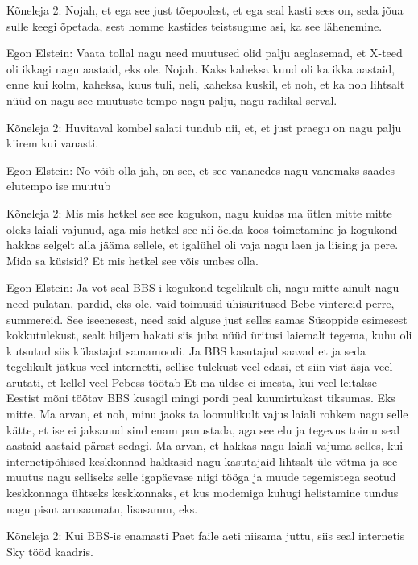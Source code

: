 Kõneleja 2:
Nojah, et ega see just tõepoolest, et ega seal kasti sees on, seda jõua sulle keegi õpetada, sest homme kastides teistsugune asi, ka see lähenemine.
                 
Egon Elstein:
Vaata tollal nagu need muutused olid palju aeglasemad, et X-teed oli ikkagi nagu aastaid, eks ole.
Nojah.
Kaks kaheksa kuud oli ka ikka aastaid, enne kui kolm, kaheksa, kuus tuli, neli, kaheksa kuskil, et noh, et ka noh lihtsalt nüüd on nagu see muutuste tempo nagu palju, nagu radikal serval.
                 
Kõneleja 2:
Huvitaval kombel salati tundub nii, et, et just praegu on nagu palju kiirem kui vanasti.
                 
Egon Elstein:
No võib-olla jah, on see, et see vananedes nagu vanemaks saades elutempo ise muutub
                 
Kõneleja 2:
Mis mis hetkel see see kogukon, nagu kuidas ma ütlen mitte mitte oleks laiali vajunud, aga mis hetkel see nii-öelda koos toimetamine ja kogukond hakkas selgelt alla jääma sellele, et igalühel oli vaja nagu laen ja liising ja pere. Mida sa küsisid? Et mis hetkel see võis umbes olla.
                 
Egon Elstein:
Ja vot seal BBS-i kogukond tegelikult oli, nagu mitte ainult nagu need pulatan, pardid, eks ole, vaid toimusid ühisüritused Bebe vintereid perre, summereid.
See iseenesest, need said alguse just selles samas Süsoppide esimesest kokkutulekust, sealt hiljem hakati siis juba nüüd üritusi laiemalt tegema, kuhu oli kutsutud siis külastajat samamoodi. Ja BBS kasutajad saavad et ja seda tegelikult jätkus veel internetti, sellise tulekust veel edasi, et siin vist äsja veel arutati, et kellel veel Pebess töötab
Et ma üldse ei imesta, kui veel leitakse Eestist mõni töötav BBS kusagil mingi pordi peal kuumirtukast tiksumas. Eks mitte.
Ma arvan, et noh, minu jaoks ta loomulikult vajus laiali rohkem nagu selle kätte, et ise ei jaksanud sind enam panustada, aga see elu ja tegevus toimu seal aastaid-aastaid pärast sedagi.
Ma arvan, et hakkas nagu laiali vajuma selles, kui internetipõhised keskkonnad hakkasid nagu kasutajaid lihtsalt üle võtma ja see muutus nagu selliseks selle igapäevase niigi tööga ja muude tegemistega seotud keskkonnaga ühtseks keskkonnaks, et kus modemiga kuhugi helistamine tundus nagu pisut arusaamatu, lisasamm, eks.
                 
Kõneleja 2:
Kui BBS-is enamasti Paet faile aeti niisama juttu, siis seal internetis Sky tööd kaadris.
                 
